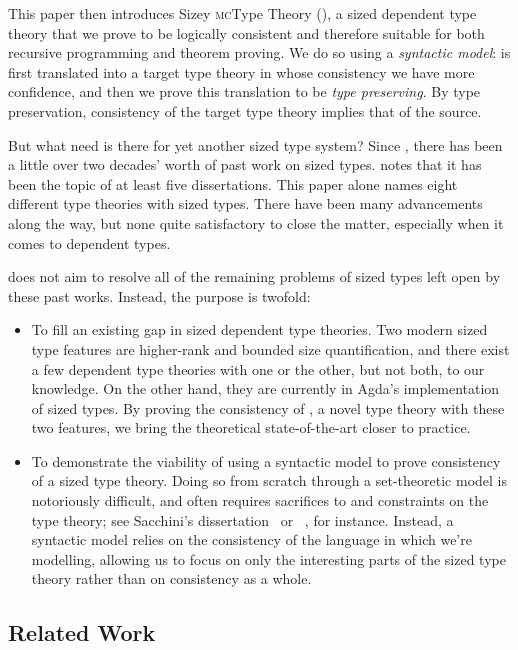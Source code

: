 \documentclass[acmsmall,review,anonymous]{acmart}\settopmatter{printfolios=true,printccs=false,printacmref=false}
\begin{document}
This paper then introduces Sizey \textsc{mc}Type Theory (\lang),
a sized dependent type theory that we prove to be logically consistent
and therefore suitable for both recursive programming and theorem proving.
We do so using a \emph{syntactic model}:
\lang is first translated into a target type theory in whose consistency we have more confidence,
and then we prove this translation to be \emph{type preserving}.
By type preservation, consistency of the target type theory implies that of the source.

But what need is there for yet another sized type system?
Since \citet{hughes}, there has been a little over two decades' worth of past work on sized types.
\citet{flationary} notes that it has been the topic of at least five dissertations.
This paper alone names eight different type theories with sized types.
There have been many advancements along the way,
but none quite satisfactory to close the matter,
especially when it comes to dependent types.

\lang does not aim to resolve
all of the remaining problems of sized types left open by these past works.
Instead, the purpose is twofold:

\begin{itemize}
  \item To fill an existing gap in sized dependent type theories.
    Two modern sized type features are higher-rank and bounded size quantification,
    and there exist a few dependent type theories with one or the other,
    but not both, to our knowledge.
    On the other hand, they are currently in Agda's implementation of sized types.
    By proving the consistency of \lang, a novel type theory with these two features,
    we bring the theoretical state-of-the-art closer to practice.
  \item To demonstrate the viability of using a syntactic model to prove consistency
    of a sized type theory.
    Doing so from scratch through a set-theoretic model is notoriously difficult,
    and often requires sacrifices to and constraints on the type theory;
    see Sacchini's dissertation~\citep{CIC-hat-minus} or \CIChatstar~\citep{CIC-hat-star},
    for instance.
    Instead, a syntactic model relies on the consistency of the language in which we're modelling,
    allowing us to focus on only the interesting parts of the sized type theory
    rather than on consistency as a whole.
\end{itemize}

\subsection{Related Work}
\end{document}
